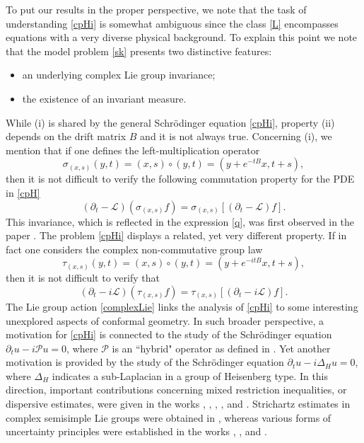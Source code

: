\documentclass[11pt,a4paper]{amsart}
\newcommand{\p}{\partial}
\numberwithin{equation}{section}
\numberwithin{equation}{section}
\begin{document}
To put our results in the proper perspective, we note that the task of understanding \eqref{cpHi} is somewhat ambiguous since the class \eqref{L} encompasses equations with a very diverse physical background. To explain this point we note that the model problem \eqref{sk} presents two distinctive features:
\begin{itemize}
\item[(i)] an underlying complex Lie group invariance; 
\item[(ii)] the existence of an invariant measure.
\end{itemize}
While (i) is shared by the general Schr\"odinger equation \eqref{cpHi}, property (ii) depends on the drift matrix $B$ and it is not always true. 
Concerning (i), we mention that if one defines the left-multiplication operator
\[
\sigma_{(x,s)} (y,t) = (x,s) \circ (y,t) = (y + e^{-tB}x,t+s),
\]
then it is not difficult to verify the following commutation property for the PDE in \eqref{cpH}   
\[
(\p_t  -  \mathscr L)(\sigma_{(x,s)} f) = \sigma_{(x,s)}[(\p_t  -  \mathscr L) f].
\]
This invariance, which is reflected in the expression \eqref{q}, was first observed in the paper \cite{LP}. The problem \eqref{cpHi} displays a related, yet very different property. If in fact one considers the complex non-commutative group law 
\begin{equation}\label{complexLie}
\tau_{(x,s)} (y,t) = (x,s)\circ (y,t) = (y + e^{-itB}x,t+s),
\end{equation}
then it is not difficult to verify that 
\[
(\p_t  - i \mathscr L)(\tau_{(x,s)} f) = \tau_{(x,s)}[(\p_t  - i \mathscr L) f].
\]
The Lie group action \eqref{complexLie} links the analysis of \eqref{cpHi} to some interesting unexplored aspects of conformal geometry. In such broader perspective,  a motivation for \eqref{cpHi} is connected to the study of the Schr\"odinger equation $\p_t u - i \mathscr P u = 0$, where $\mathscr P$ is an ``hybrid" operator as defined in \cite{GT}. Yet another motivation is provided by the study of the Schr\"odinger equation $\p_t u - i \Delta_H u = 0$, where $\Delta_H$ indicates a sub-Laplacian in a group of Heisenberg type. In this direction, important contributions concerning mixed restriction inequalities, or dispersive estimates, were given in the works  \cite{Mu}, \cite{BaPaXu}, \cite{Hi}, \cite{BaFeGa}, \cite{BaBaGa} and \cite{BaGa}. Strichartz estimates in complex semisimple Lie groups were obtained in \cite{Cha}, whereas various forms of uncertainty principles were established in the works \cite{SST}, \cite{Cha}, \cite{Vel} and \cite{LM}. 
\end{document}
